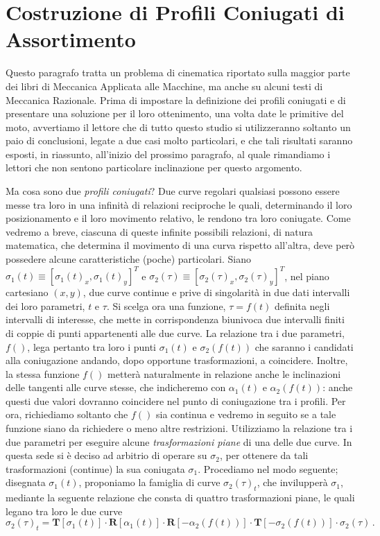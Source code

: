 \section{Costruzione di Profili Coniugati di Assortimento} \label{prof_con}

\noindent Questo paragrafo tratta un problema di cinematica riportato
sulla maggior parte dei
 libri di Meccanica Applicata alle Macchine, ma anche su
alcuni testi di Meccanica Razionale. Prima di 
impostare la definizione dei profili coniugati e di presentare una soluzione
per il loro ottenimento, una volta date le primitive del moto, avvertiamo
il lettore che di tutto questo studio si utilizzeranno soltanto un paio di
conclusioni, legate a due casi molto particolari,
e che tali risultati saranno 
esposti, in riassunto, all'inizio del prossimo paragrafo, al quale rimandiamo
i lettori che non sentono particolare inclinazione per questo argomento.

\noindent Ma cosa sono due {\em profili coniugati}?
Due curve regolari qualsiasi possono essere messe tra loro in una
infinit\`a di relazioni reciproche le quali, determinando il loro
posizionamento e il loro movimento relativo,
le rendono tra loro coniugate. 
Come vedremo a breve, ciascuna di queste infinite possibili relazioni, di
natura matematica, che determina il movimento di una curva rispetto all'altra,
deve per\`o possedere alcune caratteristiche (poche) particolari.
Siano $\sigma_1(t)\equiv [\sigma_1(t)_x,\sigma_1(t)_y]^T$ e
$\sigma_2(\tau)\equiv [\sigma_2(\tau)_x,\sigma_2(\tau)_y]^T$,
nel piano cartesiano $(x,y)$, due curve continue e prive di singolarit\`a
in due dati intervalli dei loro parametri, $t$ e $\tau$.
Si scelga ora una funzione, $\tau=f(t)$ definita negli intervalli di interesse,
che mette in corrispondenza biunivoca due intervalli finiti
di coppie di punti appartenenti alle due curve. La relazione tra i due
parametri, $f()$, lega pertanto tra loro i punti
$\sigma_1(t)$ e $\sigma_2(f(t))$ che saranno i candidati
alla coniugazione andando, dopo opportune trasformazioni, a coincidere.
Inoltre, la stessa funzione $f()$ metter\`a naturalmente in relazione anche
le inclinazioni delle tangenti alle curve stesse, che
indicheremo con $\alpha_1(t)$ e $\alpha_2(f(t))$:
anche questi due valori dovranno coincidere nel punto
di coniugazione tra i profili.
Per ora, richiediamo soltanto che $f()$ sia continua e vedremo in seguito
se a tale funzione siano da richiedere o meno altre restrizioni.
Utilizziamo la relazione tra i due parametri per eseguire
alcune {\em trasformazioni piane} di una delle due
curve. In questa sede si \`e deciso ad arbitrio di operare su $\sigma_2$, per
ottenere da tali trasformazioni (continue) la sua coniugata $\sigma_1$.
Procediamo nel modo
seguente; disegnata $\sigma_1(t)$, proponiamo la famiglia di curve
${\sigma_2(\tau)}_t$, che invilupper\`a $\sigma_1$,
mediante la seguente relazione che consta di quattro trasformazioni piane,
le quali legano tra loro le due curve
\begin{equation}
{\sigma_2(\tau)}_t = 
 {\bm T}[\sigma_1(t)]\cdot {\bm R}[\alpha_1(t)]
\cdot{\bm R}[-\alpha_2(f(t))]\cdot
 {\bm T} [-\sigma_2(f(t))]\cdot \sigma_2(\tau)\,.
\label{eq:inviluppo}
\end{equation}

